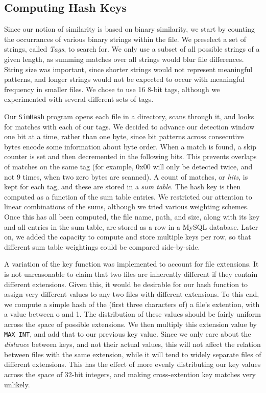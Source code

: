 \documentclass[10pt, twocolumn]{article}
\begin{document}
\subsection{Computing Hash Keys}

Since our notion of similarity is based on binary similarity, we start by counting the occurrances of various binary strings within the file.  We preselect a set of strings, called {\it Tags}, to search for.  We only use a subset of all possible strings of a given length, as summing matches over all strings would blur file differences.  String size was important, since shorter strings would not represent meaningful patterns, and longer strings would not be expected to occur with meaningful frequency in smaller files.  We chose to use 16 8-bit tags, although we experimented with several different sets of tags.

Our {\tt SimHash} program opens each file in a directory, scans through it, and looks for matches with each of our tags.  We decided to advance our detection window one bit at a time, rather than one byte, since bit patterns across consecutive bytes encode some information about byte order.  When a match is found, a skip counter is set and then decremented in the following bits.  This prevents overlaps of matches on the same tag (for example, 0x00 will only be detected twice, and not 9 times, when two zero bytes are scanned).  A count of matches, or {\it hits}, is kept for each tag, and these are stored in a {\it sum table}.  The hash key is then computed as a function of the sum table entries.  We restricted our attention to linear combinations of the sums, although we tried various weighting schemes.  Once this has all been computed, the file name, path, and size, along with its key and all entries in the sum table, are stored as a row in  a MySQL database.  Later on, we added the capacity to compute and store multiple keys per row, so that different sum table weightings could be compared side-by-side.

A variation of the key function was implemented to account for file extensions.  It is not unreasonable to claim that two files are inherently different if they contain different extensions.  Given this, it would be desirable for our hash function to assign very different values to any two files with different extensions.  To this end, we compute a simple hash of the (first three characters of) a file's extention, with a value between o and 1.  The distribution of these values should be fairly uniform across the space of possible extensions.  We then multiply this extension value by {\tt MAX\_INT}, and add that to our previous key value.  Since we only care about the {\it distance} between keys, and not their actual values, this will not affect the relation between files with the same extension, while it will tend to widely separate files of different extensions.  This has the effect of more evenly distributing our key values across the space of 32-bit integers, and making cross-extention key matches very unlikely.
\end{document}
